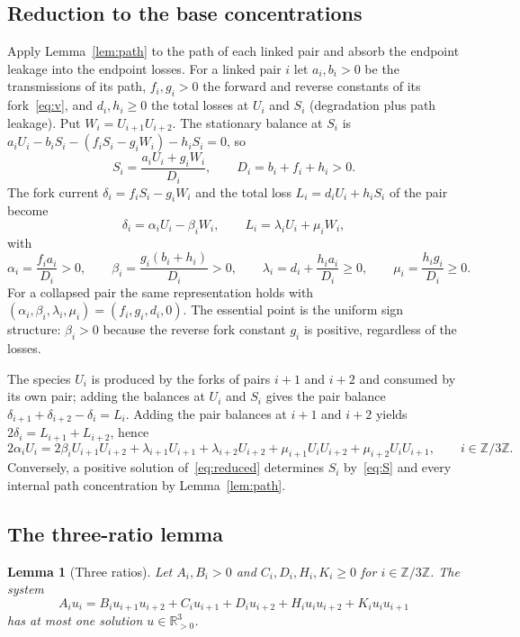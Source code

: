 \documentclass[11pt,a4paper]{article}
\theoremstyle{plain}
\newtheorem{lemma}[theorem]{Lemma}
\theoremstyle{definition}
\theoremstyle{remark}
\numberwithin{equation}{section}
\newcommand{\R}{\mathbb{R}}
\newcommand{\Z}{\mathbb{Z}}
\begin{document}
\subsection{Reduction to the base concentrations}
Apply Lemma~\ref{lem:path} to the path of each linked pair and absorb the endpoint leakage into the endpoint losses. For a linked pair $i$ let $a_i,b_i>0$ be the transmissions of its path, $f_i,g_i>0$ the forward and reverse constants of its fork~\eqref{eq:v}, and $d_i,h_i\ge0$ the total losses at $U_i$ and $S_i$ (degradation plus path leakage). Put $W_i=U_{i+1}U_{i+2}$. The stationary balance at $S_i$ is $a_iU_i-b_iS_i-(f_iS_i-g_iW_i)-h_iS_i=0$, so
\begin{equation}\label{eq:S}
S_i=\frac{a_iU_i+g_iW_i}{D_i},\qquad D_i=b_i+f_i+h_i>0 .
\end{equation}
The fork current $\delta_i=f_iS_i-g_iW_i$ and the total loss $L_i=d_iU_i+h_iS_i$ of the pair become
\begin{equation}\label{eq:response}
\delta_i=\alpha_iU_i-\beta_iW_i,\qquad L_i=\lambda_iU_i+\mu_iW_i,
\end{equation}
with
\[
\alpha_i=\frac{f_ia_i}{D_i}>0,\qquad
\beta_i=\frac{g_i(b_i+h_i)}{D_i}>0,\qquad
\lambda_i=d_i+\frac{h_ia_i}{D_i}\ge0,\qquad
\mu_i=\frac{h_ig_i}{D_i}\ge0 .
\]
For a collapsed pair the same representation holds with $(\alpha_i,\beta_i,\lambda_i,\mu_i)=(f_i,g_i,d_i,0)$. The essential point is the uniform sign structure: $\beta_i>0$ because the reverse fork constant $g_i$ is positive, regardless of the losses.

The species $U_i$ is produced by the forks of pairs $i+1$ and $i+2$ and consumed by its own pair; adding the balances at $U_i$ and $S_i$ gives the pair balance $\delta_{i+1}+\delta_{i+2}-\delta_i=L_i$. Adding the pair balances at $i+1$ and $i+2$ yields $2\delta_i=L_{i+1}+L_{i+2}$, hence
\begin{equation}\label{eq:reduced}
2\alpha_iU_i
=2\beta_iU_{i+1}U_{i+2}
+\lambda_{i+1}U_{i+1}+\lambda_{i+2}U_{i+2}
+\mu_{i+1}U_iU_{i+2}+\mu_{i+2}U_iU_{i+1},
\qquad i\in\Z/3\Z .
\end{equation}
Conversely, a positive solution of~\eqref{eq:reduced} determines $S_i$ by~\eqref{eq:S} and every internal path concentration by Lemma~\ref{lem:path}.

\subsection{The three-ratio lemma}

\begin{lemma}[Three ratios]\label{lem:ratios}
Let $A_i,B_i>0$ and $C_i,D_i,H_i,K_i\ge0$ for $i\in\Z/3\Z$. The system
\begin{equation}\label{eq:ratiosystem}
A_iu_i=B_iu_{i+1}u_{i+2}+C_iu_{i+1}+D_iu_{i+2}+H_iu_iu_{i+2}+K_iu_iu_{i+1}
\end{equation}
has at most one solution $u\in\R^3_{>0}$.
\end{lemma}
\end{document}

